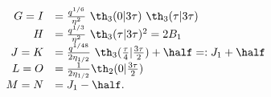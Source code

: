 \begin{equation}
  \begin{array}{rl}
G =I &= {q^{1/6}\over \eta^2}~\th_3(0|3\tau)~\th_3(\tau|3\tau)\\
H &= {q^{1/3}\over \eta^2}~\th_3(\tau|3\tau)^2  =2 B_1\\
J=K &= {q^{1/48} \over 2\eta_{1/2}}~\th_3({\tau\over 4}|{3\tau\over 2}) + \half =: J_1 + \half  \\
L =O &= {1\over 2\eta_{1/2}}\th_2(0|{3\tau\over 2})  \\
M =N &= J_1-\half.
  \end{array}
\end{equation}

